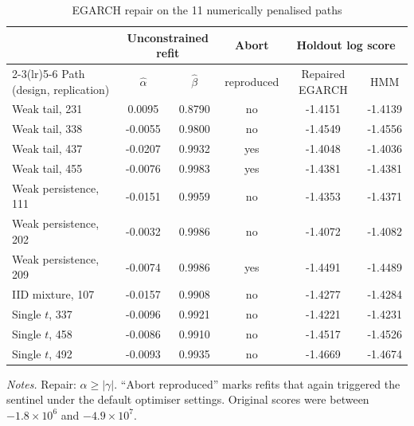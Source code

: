 \documentclass[11pt,a4paper]{article}
\theoremstyle{plain}
\theoremstyle{remark}
\begin{document}
\begin{table}[ht]
\centering\small
\caption{EGARCH repair on the 11 numerically penalised paths}\label{tab:egarch}
\begin{tabular}{lccccc}
\toprule
 & \multicolumn{2}{c}{Unconstrained refit} & Abort & \multicolumn{2}{c}{Holdout log score}\\
\cmidrule(lr){2-3}\cmidrule(lr){5-6}
Path (design, replication) & $\hat\alpha$ & $\hat\beta$ & reproduced & Repaired EGARCH & HMM\\
\midrule
Weak tail, 231 & 0.0095 & 0.8790 & no & -1.4151 & -1.4139\\
Weak tail, 338 & -0.0055 & 0.9800 & no & -1.4549 & -1.4556\\
Weak tail, 437 & -0.0207 & 0.9932 & yes & -1.4048 & -1.4036\\
Weak tail, 455 & -0.0076 & 0.9983 & yes & -1.4381 & -1.4381\\
Weak persistence, 111 & -0.0151 & 0.9959 & no & -1.4353 & -1.4371\\
Weak persistence, 202 & -0.0032 & 0.9986 & no & -1.4072 & -1.4082\\
Weak persistence, 209 & -0.0074 & 0.9986 & yes & -1.4491 & -1.4489\\
IID mixture, 107 & -0.0157 & 0.9908 & no & -1.4277 & -1.4284\\
Single $t$, 337 & -0.0096 & 0.9921 & no & -1.4221 & -1.4231\\
Single $t$, 458 & -0.0086 & 0.9910 & no & -1.4517 & -1.4526\\
Single $t$, 492 & -0.0093 & 0.9935 & no & -1.4669 & -1.4674\\
\bottomrule
\end{tabular}
\par\smallskip\footnotesize\emph{Notes.} Repair: $\alpha\ge|\gamma|$. ``Abort reproduced'' marks refits that again triggered the sentinel under the default optimiser settings. Original scores were between $-1.8\times10^{6}$ and $-4.9\times10^{7}$.
\end{table}
\end{document}
